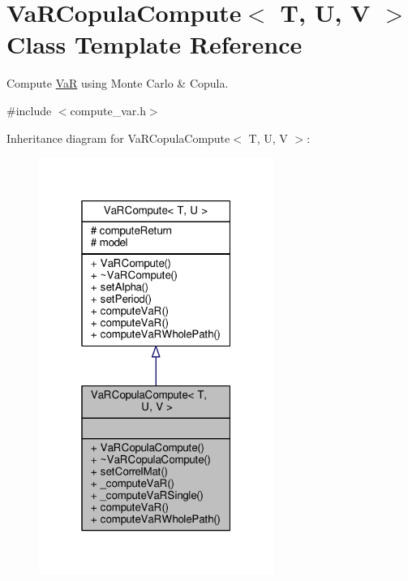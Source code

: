 \hypertarget{classVaRCopulaCompute}{}\section{Va\+R\+Copula\+Compute$<$ T, U, V $>$ Class Template Reference}
\label{classVaRCopulaCompute}


Compute \hyperlink{classVaR}{VaR} using Monte Carlo \& Copula.  




{\ttfamily \#include $<$compute\+\_\+var.\+h$>$}



Inheritance diagram for Va\+R\+Copula\+Compute$<$ T, U, V $>$\+:
\nopagebreak
\begin{figure}[H]
\begin{center}
\leavevmode
\includegraphics[width=217pt]{classVaRCopulaCompute__inherit__graph}
\end{center}
\end{figure}


